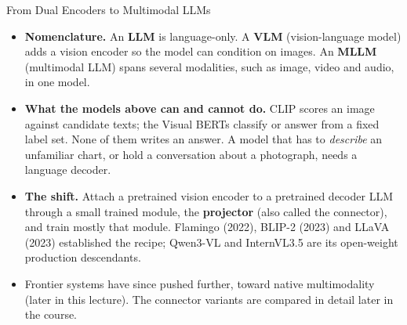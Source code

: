 \begin{frame}{From Dual Encoders to Multimodal LLMs}
  \begin{itemize}
    \item[{\color{red}\textbullet}] \textbf{Nomenclature.} An \textbf{LLM} is language-only. A
      \textbf{VLM} (vision-language model) adds a vision encoder so the model can condition on images.
      An \textbf{MLLM} (multimodal LLM) spans several modalities, such as image, video and audio, in one model.
    \item[{\color{red}\textbullet}] \textbf{What the models above can and cannot do.} CLIP scores an
      image against candidate texts; the Visual BERTs classify or answer from a fixed label set. None of
      them writes an answer. A model that has to \emph{describe} an unfamiliar chart, or hold a
      conversation about a photograph, needs a language decoder.
    \item[{\color{red}\textbullet}] \textbf{The shift.} Attach a pretrained vision encoder to a
      pretrained decoder LLM through a small trained module, the \textbf{projector} (also called the
      connector), and train mostly that module. Flamingo (2022), BLIP-2 (2023) and LLaVA (2023)
      established the recipe; Qwen3-VL and InternVL3.5 are its open-weight production descendants.
    \item[{\color{red}\textbullet}] Frontier systems have since pushed further, toward native multimodality (later
      in this lecture). The connector variants are compared in detail later in the course.
  \end{itemize}
\end{frame}


